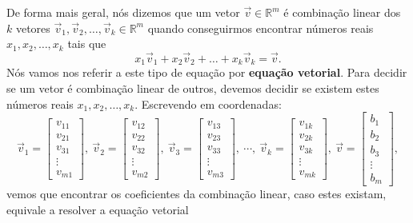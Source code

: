 \documentclass[../livro.tex]{subfiles}  %
\begin{document}
De forma mais geral, nós dizemos que um vetor $\vec{v} \in \mathbb{R}^m$ é combinação linear dos $k$ vetores $\vec{v}_1, \vec{v}_2, \dots, \vec{v}_k  \in \mathbb{R}^m$ quando conseguirmos encontrar números reais $x_1, x_2, \dots, x_k$ tais que
\begin{equation}
x_1 \vec{v}_1 + x_2 \vec{v}_2 + \dots + x_k \vec{v}_k = \vec{v}.
\end{equation} Nós vamos nos referir a este tipo de equação por \textbf{equação vetorial}. Para decidir se um vetor é combinação linear de outros, devemos decidir se existem estes números reais $x_1, x_2, \dots, x_k$. Escrevendo em coordenadas:
\begin{equation}
\vec{v}_1 =
\left[
  \begin{array}{c}
    v_{11} \\
    v_{21} \\
    v_{31} \\
    \vdots \\
    v_{m1}
  \end{array}
\right], \
\vec{v}_2 =
\left[
  \begin{array}{c}
    v_{12} \\
    v_{22} \\
    v_{32} \\
    \vdots \\
    v_{m2}
  \end{array}
\right], \
\vec{v}_3 =
\left[
  \begin{array}{c}
    v_{13} \\
    v_{23} \\
    v_{33} \\
    \vdots \\
    v_{m3}
  \end{array}
\right], \ \cdots, \
\vec{v}_k =
\left[
  \begin{array}{c}
    v_{1k} \\
    v_{2k} \\
    v_{3k} \\
    \vdots \\
    v_{mk}
  \end{array}
\right], \
\vec{v} =
\left[
  \begin{array}{c}
    b_{1} \\
    b_{2} \\
    b_{3} \\
    \vdots \\
    b_{m}
  \end{array}
\right],
\end{equation} vemos que encontrar os coeficientes da combinação linear, caso estes existam, equivale a resolver a equação vetorial
\end{document}
